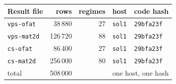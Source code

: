 \footnotesize
\begin{tabular}{@{}lrrll@{}}
\toprule
Result file & rows & regimes & host & code hash \\
\midrule
\texttt{vps-ofat} & 38\,880 & 27 & \texttt{sol1} & \texttt{29bfa23f} \\
\texttt{vps-mat2d} & 126\,720 & 88 & \texttt{sol1} & \texttt{29bfa23f} \\
\texttt{cs-ofat} & 86\,400 & 27 & \texttt{sol1} & \texttt{29bfa23f} \\
\texttt{cs-mat2d} & 256\,000 & 80 & \texttt{sol1} & \texttt{29bfa23f} \\
\midrule
total & 508\,000 & & \multicolumn{2}{l}{one host, one hash} \\
\bottomrule
\end{tabular}
